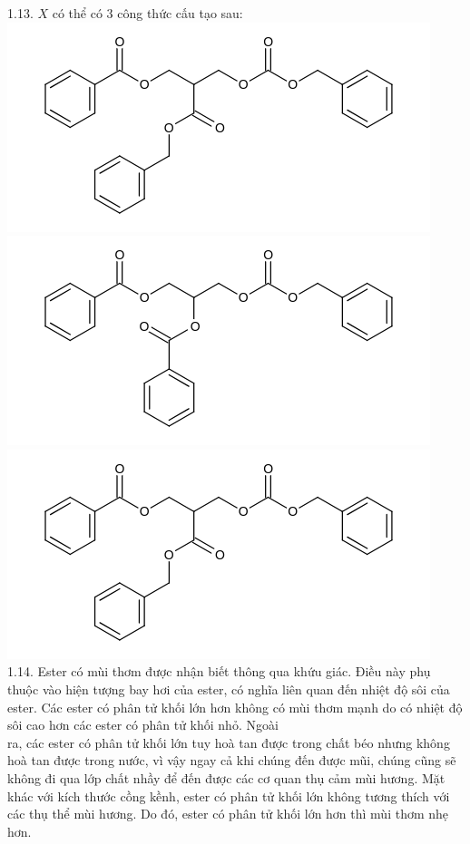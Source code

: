 \documentclass[10pt]{article}
\begin{document}
1.13. $X$ có thể có 3 công thức cấu tạo sau:\\
\includegraphics{smile-d6348fae1e8764fdcbca8c349238f4da9aad0aef}\\
\includegraphics{smile-af940decc1528d6904d789773681f5c04f7fb945}\\
\includegraphics{smile-2bfd6534941131a22f97a9093713d785a938f66b}\\
1.14. Ester có mùi thơm được nhận biết thông qua khứu giác. Điều này phụ thuộc vào hiện tượng bay hơi của ester, có nghĩa liên quan đến nhiệt độ sôi của ester. Các ester có phân tử khối lớn hơn không có mùi thơm mạnh do có nhiệt độ sôi cao hơn các ester có phân tử khối nhỏ. Ngoài\\
ra, các ester có phân tử khối lớn tuy hoà tan được trong chất béo nhưng không hoà tan được trong nước, vì vậy ngay cả khi chúng đến được mũi, chúng cũng sẽ không đi qua lớp chất nhầy để đến được các cơ quan thụ cảm mùi hương. Mặt khác với kích thước cồng kềnh, ester có phân tử khối lớn không tương thích với các thụ thể mùi hương. Do đó, ester có phân tử khối lớn hơn thì mùi thơm nhẹ hơn.\\
\end{document}
